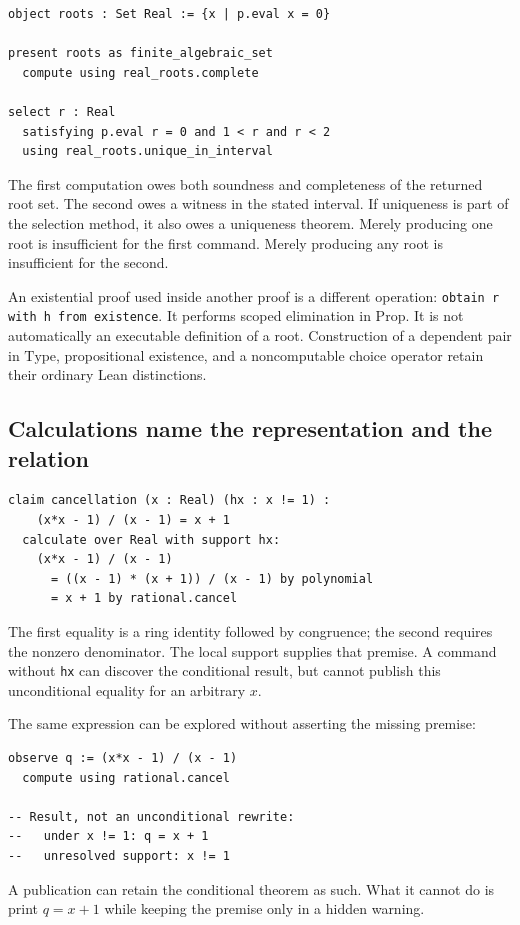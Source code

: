 \documentclass[11pt,a4paper]{article}
\newcommand{\code}[1]{\nolinkurl{#1}}
\theoremstyle{definition}
\begin{document}
\begin{lstlisting}
object roots : Set Real := {x | p.eval x = 0}

present roots as finite_algebraic_set
  compute using real_roots.complete

select r : Real
  satisfying p.eval r = 0 and 1 < r and r < 2
  using real_roots.unique_in_interval
\end{lstlisting}

The first computation owes both soundness and completeness of the returned root
set. The second owes a witness in the stated interval. If uniqueness is part of
the selection method, it also owes a uniqueness theorem. Merely producing one
root is insufficient for the first command. Merely producing any root is
insufficient for the second.

An existential proof used inside another proof is a different operation:
\code{obtain r with h from existence}. It performs scoped elimination in
\(\mathrm{Prop}\). It is not automatically an executable definition of a root.
Construction of a dependent pair in \(\mathrm{Type}\), propositional existence,
and a noncomputable choice operator retain their ordinary Lean distinctions.

\subsection{Calculations name the representation and the relation}
\begin{lstlisting}
claim cancellation (x : Real) (hx : x != 1) :
    (x*x - 1) / (x - 1) = x + 1
  calculate over Real with support hx:
    (x*x - 1) / (x - 1)
      = ((x - 1) * (x + 1)) / (x - 1) by polynomial
      = x + 1 by rational.cancel
\end{lstlisting}

The first equality is a ring identity followed by congruence; the second requires
the nonzero denominator. The local support supplies that premise. A command
without \code{hx} can discover the conditional result, but cannot publish this
unconditional equality for an arbitrary \(x\).

The same expression can be explored without asserting the missing premise:
\begin{lstlisting}
observe q := (x*x - 1) / (x - 1)
  compute using rational.cancel

-- Result, not an unconditional rewrite:
--   under x != 1: q = x + 1
--   unresolved support: x != 1
\end{lstlisting}
A publication can retain the conditional theorem as such. What it cannot do is
print \(q=x+1\) while keeping the premise only in a hidden warning.
\end{document}
